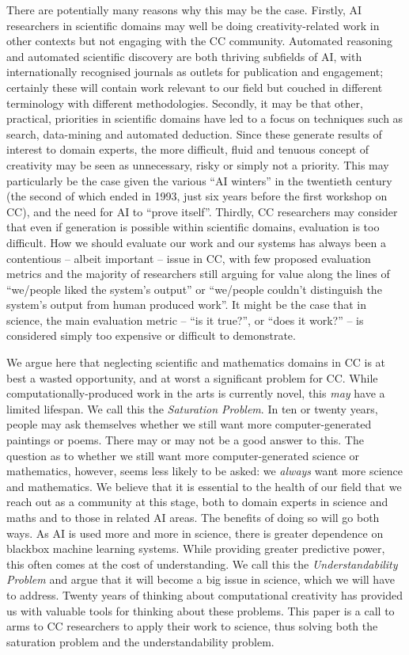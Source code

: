 \documentclass[letterpaper]{article}
\begin{document}
There are potentially many reasons why this may be the case. Firstly,
AI researchers in scientific domains may well be doing
creativity-related work in other contexts but not engaging with the CC
community. Automated reasoning and automated scientific discovery are
both thriving subfields of AI, with internationally recognised
journals as outlets for publication and engagement; certainly these
will contain work relevant to our field but couched in different
terminology with different methodologies. Secondly, it may be that
other, practical, priorities in scientific domains have led to a focus
on techniques such as search, data-mining and automated
deduction. Since these generate results of interest to domain experts,
the more difficult, fluid and tenuous concept of creativity may be
seen as unnecessary, risky or simply not a priority. This may
particularly be the case given the various ``AI winters'' in the
twentieth century (the second of which ended in 1993, just six years
before the first workshop on CC), and the need for AI to ``prove
itself''. Thirdly, CC researchers may consider that even if generation
is possible within scientific domains, evaluation is too
difficult. How we should evaluate our work and our systems has always
been a contentious -- albeit important -- issue in CC, with few
proposed evaluation metrics and the majority of researchers still
arguing for value along the lines of ``we/people liked the system's
output'' or ``we/people couldn't distinguish the system's output from
human produced work''. It might be the case that in science, the main
evaluation metric -- ``is it true?'', or ``does it work?'' -- is
considered simply too expensive or difficult to demonstrate.

We argue here that neglecting scientific and mathematics domains in CC
is at best a wasted opportunity, and at worst a significant problem
for CC. While computationally-produced work in the arts is currently
novel, this {\em may} have a limited lifespan. We call this the {\em
  Saturation Problem}. In ten or twenty years, people may ask
themselves whether we still want more computer-generated paintings or
poems. There may or may not be a good answer to this. The question as
to whether we still want more computer-generated science or
mathematics, however, seems less likely to be asked: we {\em always}
want more science and mathematics. We believe that it is essential to
the health of our field that we reach out as a community at this
stage, both to domain experts in science and maths and to those in
related AI areas. The benefits of doing so will go both ways. As AI is
used more and more in science, there is greater dependence on blackbox
machine learning systems. While providing greater predictive power,
this often comes at the cost of understanding. We call this the {\em
  Understandability Problem} and argue that it will become a big issue
in science, which we will have to address.  Twenty years of thinking
about computational creativity has provided us with valuable tools for
thinking about these problems. This paper is a call to arms to CC
researchers to apply their work to science, thus solving both the
saturation problem and the understandability problem.
\end{document}
